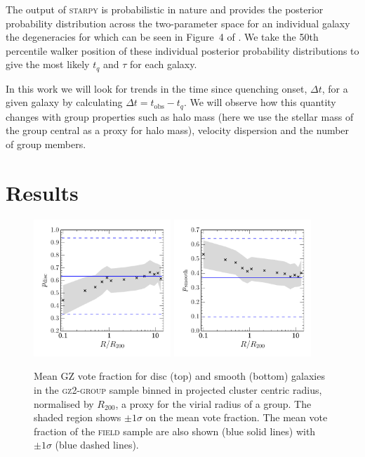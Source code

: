 \documentclass[useAMS,usenatbib]{mn2e}
\def\starpy ~{\textsc{starpy}}
\begin{document}
The output of \starpy  ~ is probabilistic in nature and provides the posterior probability distribution across the two-parameter space for an individual galaxy the degeneracies for which can be seen in Figure~4 of \citet{smethurst15}. We take the 50th percentile walker position of these individual posterior probability distributions to give the most likely $t_{q}$ and $\tau$ for each galaxy. 

In this work we will look for trends in the time since quenching onset, $\Delta t$, for a given galaxy by calculating $\Delta t = t_\mathrm{obs} - t_{q}$. We will observe how this quantity changes with group properties such as halo mass (here we use the stellar mass of the group central as a proxy for halo mass), velocity dispersion and the number of group members. 

\section{Results}\label{sec:results}

\begin{figure}
\includegraphics[width=0.46\textwidth]{p_disc_trend_with_log_radius_field_compare.pdf}
\includegraphics[width=0.46\textwidth]{p_smooth_trend_with_log_radius_field_compare.pdf}
\caption{Mean GZ vote fraction for disc (top) and smooth (bottom) galaxies in the \textsc{gz2-group} sample binned in projected cluster centric radius, normalised by $R_{200}$, a proxy for the virial radius of a group. The shaded region shows $\pm1\sigma$ on the mean vote fraction. The mean vote fraction of the \textsc{field} sample are also shown (blue solid lines) with $\pm1\sigma$ (blue dashed lines).}
\label{fig:morphradius}
\end{figure}
\end{document}

